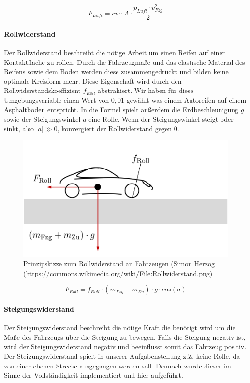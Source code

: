 \documentclass[12pt,a4paper,bibliography=totocnumbered,listof=totocnumbered, abstracton]{scrartcl}
\theoremstyle{Umgebung}
\begin{document}
\begin{equation}
F_{Luft} = cw \cdot A \cdot \frac{p_{Luft} \cdot v_{Fzg}^2}{2}
\end{equation}

\paragraph{Rollwiderstand}

Der Rollwiderstand beschreibt die nötige Arbeit um einen Reifen auf einer Kontaktfläche zu rollen. Durch die Fahrzeugmaße und das elastische Material des Reifens sowie dem Boden werden diese zusammengedrückt und bilden keine optimale Kreisform mehr. Diese Eigenschaft wird durch den Rollwiderstandskoeffizient $f_{Roll}$ abstrahiert. Wir haben für diese Umgebungsvariable einen Wert von $0,01$ gewählt was einem Autoreifen auf einem Asphaltboden entspricht. In die Formel spielt außerdem die Erdbeschleunigung $g$ sowie der Steigungswinkel  $a$ eine Rolle. Wenn der Steigungswinkel steigt oder sinkt, also $ |a|  \gg 0$, konvergiert der Rollwiderstand gegen $0$. 

\begin{figure}
	\centering
	\includegraphics[width=0.7\linewidth]{img/practical/Rollwiderstand}
	\caption{Prinzipskizze zum Rollwiderstand an Fahrzeugen (Simon Herzog (https://commons.wikimedia.org/wiki/File:Rollwiderstand.png)}
	\label{fig:Rollwiderstand}
\end{figure}

\begin{equation}
F_{Roll} = f_{Roll} \cdot (m_{Fzg} + m_{Zu}) \cdot g \cdot cos(a)
\end{equation}


\paragraph{Steigungswiderstand}

Der Steigungswiderstand beschreibt die nötige Kraft die benötigt wird um die Maße des Fahrzeugs über die Steigung zu bewegen. Falls die Steigung negativ ist, wird der Steigungswiderstand negativ und beeinflusst somit das Fahrzeug positiv. Der Steigungswiderstand spielt in unserer Aufgabenstellung z.Z. keine Rolle, da von einer ebenen Strecke ausgegangen werden soll. Dennoch wurde dieser im Sinne der Vollständigkeit implementiert und hier aufgeführt.
\end{document}
